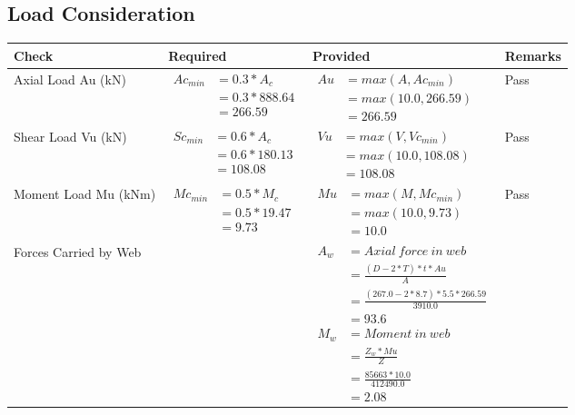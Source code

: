 \documentclass{article}%
\begin{document}
%
\newpage%
\subsection{Load Consideration}%
\label{subsec:LoadConsideration}%
\renewcommand{\arraystretch}{1.2}%
\begin{longtable}{|p{4cm}|p{5cm}|p{5.5cm}|p{1.5cm}|}%
\hline%
\rowcolor{OsdagGreen}%
Check&Required&Provided&Remarks\\%
\hline%
\endhead%
\hline%
Axial Load Au (kN)&$\begin{aligned} Ac_{min} &= 0.3 * A_c\\ &= 0.3 *888.64\\ &=266.59\end{aligned}$&$\begin{aligned} Au &= max(A,Ac_{min} )\\ &= max( 10.0,266.59)\\ &=266.59\end{aligned}$&Pass\\%
\hline%
Shear Load Vu (kN)&$\begin{aligned} Sc_{min} &= 0.6 * A_c\\ &= 0.6 *180.13\\ &=108.08\end{aligned}$&$\begin{aligned} Vu &= max(V,Vc_{min})\\ &=  max(10.0,108.08)\\ &=108.08\end{aligned}$&Pass\\%
\hline%
Moment Load Mu (kNm)&$\begin{aligned} Mc_{min} &= 0.5 * M_c\\ &= 0.5 *19.47\\ &=9.73\end{aligned}$&$\begin{aligned} Mu &= max(M,Mc_{min} )\\ &= max(10.0,9.73)\\ &=10.0\end{aligned}$&Pass\\%
\hline%
Forces Carried by Web&&$\begin{aligned}A_w &= Axial~ force~ in~ web  \\   &= \frac{(D- 2*T)*t* Au }{A} \\ &= \frac{(267.0- 2*8.7)*5.5*266.59 }{3910.0} \\ &=93.6\\ M_w &= Moment ~in ~web  \\  &= \frac{Z_w * Mu}{Z} \\ &= \frac{85663 * 10.0}{412490.0} \\ &=2.08\end{aligned}$&\\%

\end{longtable}
\end{document}
